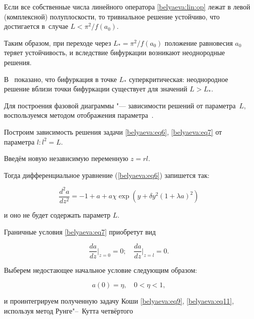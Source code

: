 Если все собственные числа линейного оператора \eqref{belyaeva:lin:op} лежат в левой (комплексной) полуплоскости, то тривиальное решение устойчиво, что достигается в~случае $L<\pi^2/f(a_0) $. 

Таким образом, при переходе через $L_*=\pi^2/f(a_0)$ положение равновесия $a_0$ теряет устойчивость, и вследствие бифуркации возникают неоднородные решения. 

В~\cite{Vestn} показано, что бифуркация в точке $L_*$ суперкритическая: неоднородное решение вблизи точки бифуркации существует для значений $L>L_*$.



Для построения фазовой диаграммы "--- зависимости решений от параметра~$L$, воспользуемся методом отображения параметра~\cite{Hol}. 

Построим зависимость решения задачи \eqref{belyaeva:eq6}, \eqref{belyaeva:eq7} от параметра $l:l^2=L$. 

Введём новую независимую переменную $z=rl$. 

Тогда дифференциальное уравнение (\ref{belyaeva:eq6}) запишется так:

\begin{equation}

 \label{belyaeva:eq9}

\frac{d^2 a}{dz^2} =-1+a+a\chi \exp(y+\delta y^2 (1+\lambda a)^2 )

\end{equation}

и оно не будет содержать параметр $L$. 

Граничные условия \eqref{belyaeva:eq7} приобретут вид

\begin{equation} 

\label{belyaeva:eq10}

\frac{da}{dz}\Big|_{z =0} =0; \quad  \frac{da}{dz}\Big|_{z = l} =0.

\end{equation}

Выберем недостающее начальное условие следующим образом:

\begin{equation} \label{belyaeva:eq11}

a(0)=\eta , \quad 0<\eta <1,

\end{equation}

и проинтегрируем полученную задачу Коши \eqref{belyaeva:eq9}, \eqref{belyaeva:eq11}, используя метод Рунге"--~Кутта четвёртого

